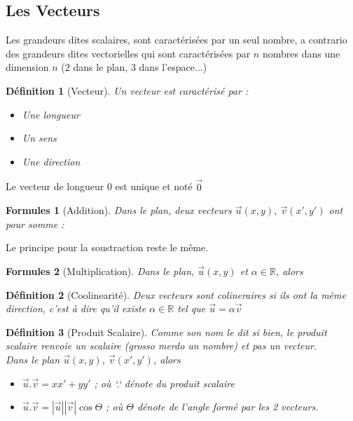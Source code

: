 \documentclass{article}
\newtheorem{defi}{Définition}
\newtheorem{form}{Formules}
\begin{document}
\subsection{Les Vecteurs}
Les grandeurs dites scalaires, sont caractérisées par un seul nombre, a contrario des grandeurs dites vectorielles qui sont caractérisées par $n$ nombres dans une dimension $n$ (2 dans le plan, 3 dans l'espace...)

\begin{defi}[Vecteur]
  Un vecteur est caractérisé par :
  \begin{itemize}
    \item Une longueur
    \item Un sens
    \item Une direction
  \end{itemize}
\end{defi}

Le vecteur de longueur 0 est unique et noté $\overrightarrow{0}$

\begin{form}[Addition]
Dans le plan, deux vecteurs $\overrightarrow{u} (x,y)$, $\overrightarrow{v} (x',y')$ ont pour somme :\\

\end{form}
Le principe pour la soustraction reste le même.

\begin{form}[Multiplication]
  Dans le plan, $\overrightarrow{u} (x,y)$ et $\alpha \in \mathbb{R}$, alors
\end{form}

\begin{defi}[Coolinearité]
  Deux vecteurs sont colineraires si ils ont la même direction, c'est à dire qu'il existe $\alpha \in \mathbb{R}$ tel que
  $\overrightarrow{u} = \alpha \overrightarrow{v}$
\end{defi}

\begin{defi}[Produit Scalaire]
  Comme son nom le dit si bien, le produit scalaire renvoie un scalaire (grosso merdo un nombre) et pas un vecteur.\\
  Dans le plan $\overrightarrow{u} (x,y)$, $\overrightarrow{v} (x',y')$, alors\\

  \begin{itemize}
    \item $\overrightarrow{u} . \overrightarrow{v} = xx' + yy'$ ; où `.` dénote du produit scalaire
    \item $\overrightarrow{u} . \overrightarrow{v} = |\overrightarrow{u}| |\overrightarrow{v}| \cos{\Theta}$  ; où $\Theta$
      dénote de l'angle formé par les 2 vecteurs.
  \end{itemize}
\end{defi}
\end{document}
